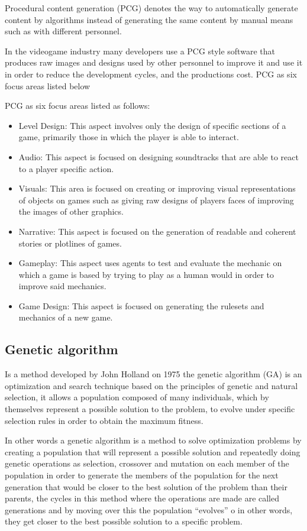 \documentclass[graybox]{svmult}
\begin{document}
Procedural content generation (PCG) denotes the way to automatically generate content by algorithms instead of generating the same content by manual means such as with different personnel.

In the videogame industry many developers use a PCG style software that produces raw images and designs used by other personnel to improve it and use it in order to reduce the development cycles, and the productions cost. 
PCG as six focus areas listed below

PCG as six focus areas listed as follows:

\begin{itemize}
    \item Level Design: This aspect involves only the design of specific sections of a game, primarily those in which the player is able to interact.
    \item Audio: This aspect is focused on designing soundtracks that are able to react to a player specific action.
    \item Visuals: This area is focused on creating or improving visual representations of objects on games such as giving raw designs of players faces of improving the images of other graphics.
    \item Narrative: This aspect is focused on the generation of readable and coherent stories or plotlines of games.
    \item Gameplay: This aspect uses agents to test and evaluate the mechanic on which a game is based by trying to play as a human would in order to improve said mechanics.
    \item Game Design: This aspect is focused on generating the rulesets and mechanics of a new game. \cite{Yannakakis2017}
\end{itemize}

\subsection{Genetic algorithm}

Is a method developed by John Holland on 1975 \cite{Holland1975} the genetic algorithm (GA) is an optimization and search technique based on the principles of genetic and natural selection, it allows a population composed of many individuals, which by themselves represent a possible solution to the problem, to evolve under specific selection rules in order to obtain the maximum fitness.

In other words a genetic algorithm is a method to solve optimization problems by creating a population that will represent a possible solution and repeatedly doing genetic operations as selection, crossover and mutation on each member of the population in order to generate the members of the population for the next generation that would be closer to the best solution of the problem than their parents, the cycles in this method where the operations are made are called generations and by moving over this the population “evolves” o in other words, they get closer to the best possible solution  to a specific problem.
\end{document}

